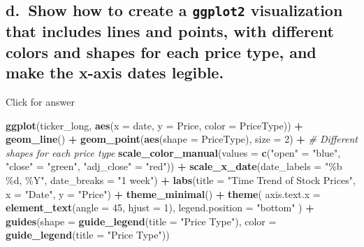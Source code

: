 \documentclass[
]{book}
\newenvironment{Shaded}{\begin{snugshade}}{\end{snugshade}}
\newcommand{\AttributeTok}[1]{\textcolor[rgb]{0.13,0.29,0.53}{#1}}
\newcommand{\CommentTok}[1]{\textcolor[rgb]{0.56,0.35,0.01}{\textit{#1}}}
\newcommand{\DecValTok}[1]{\textcolor[rgb]{0.00,0.00,0.81}{#1}}
\newcommand{\FunctionTok}[1]{\textcolor[rgb]{0.13,0.29,0.53}{\textbf{#1}}}
\newcommand{\NormalTok}[1]{#1}
\newcommand{\OtherTok}[1]{\textcolor[rgb]{0.56,0.35,0.01}{#1}}
\newcommand{\SpecialCharTok}[1]{\textcolor[rgb]{0.81,0.36,0.00}{\textbf{#1}}}
\newcommand{\StringTok}[1]{\textcolor[rgb]{0.31,0.60,0.02}{#1}}
\begin{document}
\hypertarget{d.-show-how-to-create-a-ggplot2-visualization-that-includes-lines-and-points-with-different-colors-and-shapes-for-each-price-type-and-make-the-x-axis-dates-legible.}{%
\subsection{\texorpdfstring{d.~Show how to create a \texttt{ggplot2} visualization that includes lines and points, with different colors and shapes for each price type, and make the x-axis dates legible.}{d.~Show how to create a ggplot2 visualization that includes lines and points, with different colors and shapes for each price type, and make the x-axis dates legible.}}\label{d.-show-how-to-create-a-ggplot2-visualization-that-includes-lines-and-points-with-different-colors-and-shapes-for-each-price-type-and-make-the-x-axis-dates-legible.}}

Click for answer

\begin{Shaded}
\begin{Highlighting}[]
\FunctionTok{ggplot}\NormalTok{(ticker\_long, }\FunctionTok{aes}\NormalTok{(}\AttributeTok{x =}\NormalTok{ date, }\AttributeTok{y =}\NormalTok{ Price, }\AttributeTok{color =}\NormalTok{ PriceType)) }\SpecialCharTok{+}
  \FunctionTok{geom\_line}\NormalTok{() }\SpecialCharTok{+}
  \FunctionTok{geom\_point}\NormalTok{(}\FunctionTok{aes}\NormalTok{(}\AttributeTok{shape =}\NormalTok{ PriceType), }\AttributeTok{size =} \DecValTok{2}\NormalTok{) }\SpecialCharTok{+} \CommentTok{\# Different shapes for each price type}
  \FunctionTok{scale\_color\_manual}\NormalTok{(}\AttributeTok{values =} \FunctionTok{c}\NormalTok{(}\StringTok{"open"} \OtherTok{=} \StringTok{"blue"}\NormalTok{, }\StringTok{"close"} \OtherTok{=} \StringTok{"green"}\NormalTok{, }\StringTok{"adj\_close"} \OtherTok{=} \StringTok{"red"}\NormalTok{)) }\SpecialCharTok{+}
  \FunctionTok{scale\_x\_date}\NormalTok{(}\AttributeTok{date\_labels =} \StringTok{"\%b \%d, \%Y"}\NormalTok{, }\AttributeTok{date\_breaks =} \StringTok{"1 week"}\NormalTok{) }\SpecialCharTok{+} 
  \FunctionTok{labs}\NormalTok{(}\AttributeTok{title =} \StringTok{"Time Trend of Stock Prices"}\NormalTok{, }\AttributeTok{x =} \StringTok{"Date"}\NormalTok{, }\AttributeTok{y =} \StringTok{"Price"}\NormalTok{) }\SpecialCharTok{+}
  \FunctionTok{theme\_minimal}\NormalTok{() }\SpecialCharTok{+}
  \FunctionTok{theme}\NormalTok{(}
    \AttributeTok{axis.text.x =} \FunctionTok{element\_text}\NormalTok{(}\AttributeTok{angle =} \DecValTok{45}\NormalTok{, }\AttributeTok{hjust =} \DecValTok{1}\NormalTok{),}
    \AttributeTok{legend.position =} \StringTok{"bottom"}
\NormalTok{  ) }\SpecialCharTok{+}
  \FunctionTok{guides}\NormalTok{(}\AttributeTok{shape =} \FunctionTok{guide\_legend}\NormalTok{(}\AttributeTok{title =} \StringTok{"Price Type"}\NormalTok{), }\AttributeTok{color =} \FunctionTok{guide\_legend}\NormalTok{(}\AttributeTok{title =} \StringTok{"Price Type"}\NormalTok{))}
\end{Highlighting}
\end{Shaded}
\end{document}
